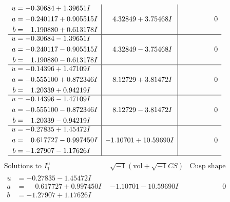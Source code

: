 \documentclass[1p]{elsarticle_modified}
\theoremstyle{definition}
\newcommand{\I}{\sqrt{-1}}
\begin{document}
$$\begin{array}{c|c|c}
\begin{aligned}
u &= -0.30684 + 1.39651 I \\
a &= -0.240117 + 0.905515 I \\
b &= \phantom{-}1.190880 + 0.613178 I\end{aligned}
 & \phantom{-}4.32849 + 3.75468 I & \phantom{-0.000000 } 0 \\ \hline\begin{aligned}
u &= -0.30684 - 1.39651 I \\
a &= -0.240117 - 0.905515 I \\
b &= \phantom{-}1.190880 - 0.613178 I\end{aligned}
 & \phantom{-}4.32849 - 3.75468 I & \phantom{-0.000000 } 0 \\ \hline\begin{aligned}
u &= -0.14396 + 1.47109 I \\
a &= -0.555100 + 0.872346 I \\
b &= \phantom{-}1.20339 + 0.94219 I\end{aligned}
 & \phantom{-}8.12729 + 3.81472 I & \phantom{-0.000000 } 0 \\ \hline\begin{aligned}
u &= -0.14396 - 1.47109 I \\
a &= -0.555100 - 0.872346 I \\
b &= \phantom{-}1.20339 - 0.94219 I\end{aligned}
 & \phantom{-}8.12729 - 3.81472 I & \phantom{-0.000000 } 0 \\ \hline\begin{aligned}
u &= -0.27835 + 1.45472 I \\
a &= \phantom{-}0.617727 - 0.997450 I \\
b &= -1.27907 - 1.17626 I\end{aligned}
 & -1.10701 + 10.59690 I & \phantom{-0.000000 } 0\\
 \hline 
 \end{array}$$\newpage$$\begin{array}{c|c|c}  
\text{Solutions to }I^u_{1}& \I (\text{vol} + \sqrt{-1}CS) & \text{Cusp shape}\\
 \hline 
\begin{aligned}
u &= -0.27835 - 1.45472 I \\
a &= \phantom{-}0.617727 + 0.997450 I \\
b &= -1.27907 + 1.17626 I\end{aligned}
 & -1.10701 - 10.59690 I & \phantom{-0.000000 } 0 \\ \hline\begin{aligned}

\end{aligned}
\end{array}$$
\end{document}

